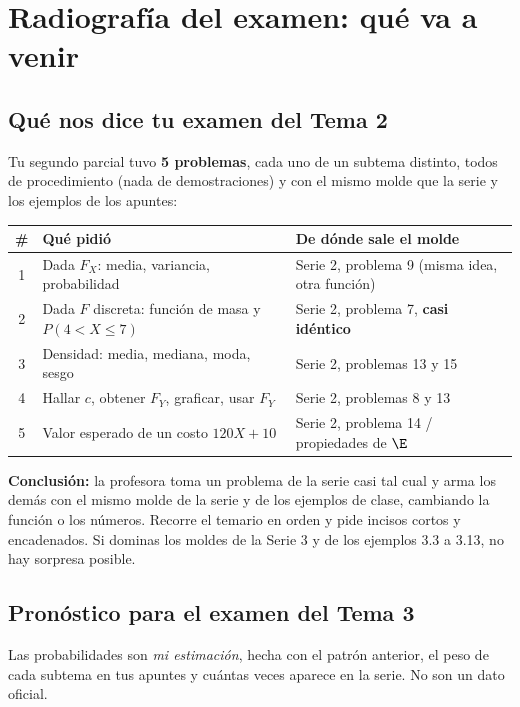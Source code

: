\section{Radiograf\'ia del examen: qu\'e va a venir}

\subsection{Qu\'e nos dice tu examen del Tema 2}

Tu segundo parcial tuvo \textbf{5 problemas}, cada uno de un subtema distinto, todos de procedimiento
(nada de demostraciones) y con el mismo molde que la serie y los ejemplos de los apuntes:

\begin{center}\small
\begin{tabular}{clp{7.2cm}}
\toprule
\# & Qu\'e pidi\'o & De d\'onde sale el molde\\
\midrule
1 & Dada $F_X$: media, variancia, probabilidad & Serie 2, problema 9 (misma idea, otra funci\'on)\\
2 & Dada $F$ discreta: funci\'on de masa y $P(4<X\le 7)$ & Serie 2, problema 7, \textbf{casi id\'entico}\\
3 & Densidad: media, mediana, moda, sesgo & Serie 2, problemas 13 y 15\\
4 & Hallar $c$, obtener $F_Y$, graficar, usar $F_Y$ & Serie 2, problemas 8 y 13\\
5 & Valor esperado de un costo $120X+10$ & Serie 2, problema 14 / propiedades de $\E$\\
\bottomrule
\end{tabular}
\end{center}

\textbf{Conclusi\'on:} la profesora toma un problema de la serie casi tal cual y arma los dem\'as con el
mismo molde de la serie y de los ejemplos de clase, cambiando la funci\'on o los n\'umeros. Recorre el temario
en orden y pide incisos cortos y encadenados. Si dominas los moldes de la Serie 3 y de los ejemplos 3.3 a 3.13,
no hay sorpresa posible.

\subsection{Pron\'ostico para el examen del Tema 3}

Las probabilidades son \emph{mi estimaci\'on}, hecha con el patr\'on anterior, el peso de cada subtema en tus
apuntes y cu\'antas veces aparece en la serie. No son un dato oficial.

